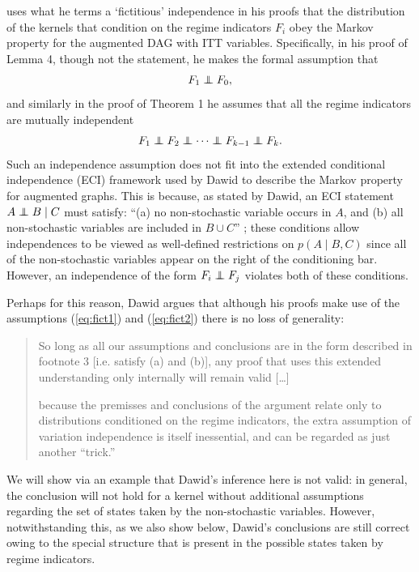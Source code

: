 \documentclass[11pt]{article}
\newcommand\indep{\protect\mathpalette{\protect\independenT}{\perp}}
\def\independenT#1#2{\mathrel{\rlap{$#1#2$}\mkern2.5mu{#1#2}}}
\begin{document}
{\citet{dawid:2021}
 uses what he terms a `fictitious' independence
 in his proofs that the distribution of the kernels that condition on the regime indicators $F_i$ obey the Markov property for the augmented DAG with ITT variables. Specifically, in his proof of Lemma 4, though not the statement, he makes the formal assumption that 
\begin{align}
F_1 \indep F_0,\label{eq:fict1}
\end{align}
and similarly in the proof of Theorem 1 he assumes that all the regime indicators are mutually independent \citep[p.76, eqn. (82)]{dawid:2021}
\begin{align}
F_1 \indep F_2 \indep \cdots \indep F_{k-1} \indep F_k.\label{eq:fict2}
\end{align}
Such an independence assumption does not fit into the extended conditional independence (ECI) framework used by Dawid to describe the Markov property for augmented graphs. This is because, as stated by Dawid, an ECI statement $A \indep B \mid C$ must satisfy: ``(a) no non-stochastic variable occurs in $A$, and (b) all non-stochastic variables are included in $B\cup C$'' \citep[fn.~3]{dawid:2021}; these conditions allow independences to be viewed as well-defined restrictions on $p(A \mid B, C)$ since all of the non-stochastic variables appear on the right of the conditioning bar. However, an independence of the form $F_i \indep F_j$ violates both of these conditions.

Perhaps for this reason, Dawid argues that although his proofs make use of the assumptions (\ref{eq:fict1}) and (\ref{eq:fict2}) there is no loss of generality:
\begin{quotation}
So long as all our assumptions and conclusions are in the form described in footnote 3 [i.e. satisfy (a) and (b)], any proof that uses this extended understanding only internally will remain valid [\ldots] \citep[p.63]{dawid:2021}\par [\ldots]
because the premisses and conclusions of the argument relate only to distributions conditioned on the regime indicators, the extra assumption of variation independence is itself inessential, and can be regarded as just another ``trick.'' \citep[p.63, fn.24]{dawid:2021}
\end{quotation}

We will show via an example that Dawid's inference here is not valid: in general, the conclusion will not hold for a kernel without additional assumptions regarding the set of states taken by the non-stochastic variables. However,
notwithstanding this, as we also show below, Dawid's conclusions are still correct owing to the special structure that is present in the possible states taken by regime indicators.


}
\end{document}
